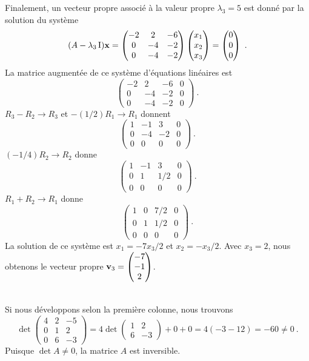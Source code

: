 {Finalement, un vecteur propre
associé à la valeur propre $\lambda_3 = 5$ est donné par la solution
du système
\[
(A-\lambda_3\operatorname{I})\mathbf{x} = 
\begin{pmatrix}
-2 & 2 & -6 \\ 0 & -4 & -2 \\ 0 & -4 & -2
\end{pmatrix}
\begin{pmatrix} x_1 \\ x_2 \\ x_3 \end{pmatrix}
= \begin{pmatrix} 0 \\ 0 \\ 0 \end{pmatrix} \ .
\]
La matrice augmentée de ce système d'équations linéaires est
\[
\left(\begin{array}{ccc|c}
-2 & 2 & -6 & 0 \\ 0 & -4 & -2 & 0 \\ 0 & -4 & -2 & 0
\end{array}\right) \ .
\]
$R_3-R_2 \rightarrow R_3$ et $-(1/2)R_1\rightarrow R_1$ donnent
\[
\left(\begin{array}{ccc|c}
1 & -1 & 3 & 0 \\ 0 & -4 & -2 & 0 \\ 0 & 0 & 0 & 0
\end{array}\right) \ .
\]
$(-1/4)R_2 \rightarrow R_2$ donne
\[
\left(\begin{array}{ccc|c}
1 & -1 & 3 & 0 \\ 0 & 1 & 1/2 & 0 \\ 0 & 0 & 0 & 0
\end{array}\right) \ .
\]
$R_1+R_2 \rightarrow R_1$ donne
\[
\left(\begin{array}{ccc|c}
1 & 0 & 7/2 & 0 \\ 0 & 1 & 1/2 & 0 \\ 0 & 0 & 0 & 0
\end{array}\right) \ .
\]
La solution de ce système est $x_1=-7x_3/2$ et $x_2=-x_3/2$.  Avec
$x_3=2$, nous obtenons le vecteur propre
$\displaystyle \mathbf{v}_3 = \begin{pmatrix} -7 \\ -1 \\ 2 \end{pmatrix} $.

\\
 Si nous développons selon la première colonne, nous trouvons
\[
\det \begin{pmatrix} 4 & 2 & -5 \\ 0 & 1 & 2 \\ 0 & 6 & -3
\end{pmatrix}
= 4 \det\begin{pmatrix} 1 & 2 \\ 6 & -3 \end{pmatrix} + 0 + 0
= 4 (-3 -12) = -60 \neq 0 \ .
\]
Puisque $\det A \neq 0$, la matrice $A$ est inversible.

}
